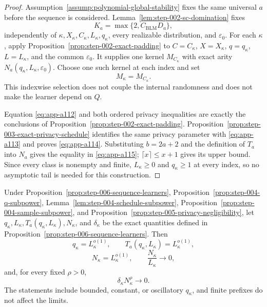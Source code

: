 \begin{proof}
Assumption~\ref{assump:polynomial-global-stability} fixes the same
universal \(a\) before the sequence is considered.
Lemma~\ref{lem:step-002-sc-domination} fixes
\[
K_a=\max\{2,C_{\mathrm{BLM}}D_a\},
\]
independently of
\(\kappa,X_\kappa,C_\kappa,L_\kappa,q_\kappa\), every realizable
distribution, and \(\varepsilon_0\).  For each \(\kappa\), apply
Proposition~\ref{prop:step-002-exact-padding} to
\(C=C_\kappa\), \(X=X_\kappa\), \(q=q_\kappa\),
\(L=L_\kappa\), and the common \(\varepsilon_0\).  It supplies one
kernel \(M_{C_\kappa}\) with exact arity
\(N_a(q_\kappa,L_\kappa,\varepsilon_0)\).  Choose one such kernel at
each index and set
\begin{equation}
M_\kappa=M_{C_\kappa}.
\label{eq:app-a116}
\end{equation}
This indexwise selection does not couple the internal randomness and
does not make the learner depend on \(Q\).

Equation \eqref{eq:app-a112} and both ordered privacy inequalities are exactly the
conclusions of Proposition~\ref{prop:step-002-exact-padding}.
Proposition~\ref{prop:step-003-exact-privacy-schedule} identifies the
same privacy parameter with \eqref{eq:app-a113} and proves \eqref{eq:app-a114}.
Substituting \(b=2a+2\) and the definition of \(T_a\) into \(N_a\)
gives the equality in \eqref{eq:app-a115}; \(\lceil x\rceil\leq x+1\) gives its
upper bound.  Since every class is nonempty and finite,
\(L_\kappa\geq0\) and \(q_\kappa\geq1\) at every index, so no
asymptotic tail is needed for this construction.
\end{proof}

\begin{proposition}
\label{prop:step-006-rate-certificates}
Under Proposition~\ref{prop:step-006-sequence-learners},
Proposition~\ref{prop:step-004-q-subpower},
Lemma~\ref{lem:step-004-schedule-subpower},
Proposition~\ref{prop:step-004-sample-subpower}, and
Proposition~\ref{prop:step-005-privacy-negligibility}, let
\(q_\kappa,L_\kappa,T_a(q_\kappa,L_\kappa),N_\kappa\), and
\(\delta_\kappa\) be the exact quantities defined in
Proposition~\ref{prop:step-006-sequence-learners}.  Then
\begin{equation}
q_\kappa=L_\kappa^{o(1)},\qquad
T_a(q_\kappa,L_\kappa)=L_\kappa^{o(1)},
\label{eq:app-a117}
\end{equation}
\begin{equation}
N_\kappa=L_\kappa^{o(1)},\qquad
\frac{N_\kappa}{L_\kappa}\longrightarrow0,
\label{eq:app-a118}
\end{equation}
and, for every fixed \(\rho>0\),
\begin{equation}
\delta_\kappa N_\kappa^\rho\longrightarrow0.
\label{eq:app-a119}
\end{equation}
The statements include bounded, constant, or oscillatory
\(q_\kappa\), and finite prefixes do not affect the limits.
\end{proposition}

